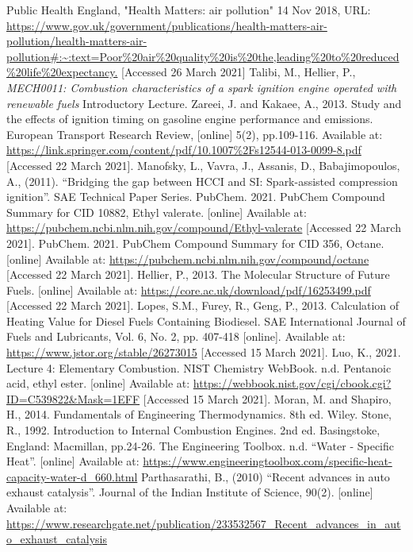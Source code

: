 \documentclass[11pt]{article}
\begin{document}
\begin{thebibliography}{00}
 Public Health England, "Health Matters: air pollution" 14 Nov 2018, URL: \url{https://www.gov.uk/government/publications/health-matters-air-pollution/health-matters-air-pollution#:~:text=Poor%20air%20quality%20is%20the,leading%20to%20reduced%20life%20expectancy.} [Accessed 26 March 2021]
 Talibi, M., Hellier, P., \textit{MECH0011: Combustion characteristics of a spark ignition engine operated with renewable fuels} Introductory Lecture.
 Zareei, J. and Kakaee, A., 2013. Study and the effects of ignition timing on gasoline engine performance and emissions. European Transport Research Review, [online] 5(2), pp.109-116. Available at: \url{https://link.springer.com/content/pdf/10.1007\%2Fs12544-013-0099-8.pdf} [Accessed 22 March 2021]. 
 Manofsky, L., Vavra, J., Assanis, D., Babajimopoulos, A., (2011). ``Bridging the gap between HCCI and SI: Spark-assisted compression ignition''. SAE Technical Paper Series. 
 PubChem. 2021. PubChem Compound Summary for CID 10882, Ethyl valerate. [online] Available at: \url{https://pubchem.ncbi.nlm.nih.gov/compound/Ethyl-valerate} [Accessed 22 March 2021]. 
 PubChem. 2021. PubChem Compound Summary for CID 356, Octane. [online] Available at: \url{https://pubchem.ncbi.nlm.nih.gov/compound/octane} [Accessed 22 March 2021]. 
 Hellier, P., 2013. The Molecular Structure of Future Fuels. [online] Available at: \url{https://core.ac.uk/download/pdf/16253499.pdf} [Accessed 22 March 2021]. 
 Lopes, S.M., Furey, R., Geng, P., 2013. Calculation of Heating Value for Diesel Fuels Containing Biodiesel. SAE International Journal of Fuels and Lubricants, Vol. 6, No. 2, pp. 407-418 [online]. Available at: \url{https://www.jstor.org/stable/26273015} [Accessed 15 March 2021]. 
 Luo, K., 2021. Lecture 4: Elementary Combustion.  
 NIST Chemistry WebBook. n.d. Pentanoic acid, ethyl ester. [online] Available at: \url{https://webbook.nist.gov/cgi/cbook.cgi?ID=C539822&Mask=1EFF} [Accessed 15 March 2021]. 
 Moran, M. and Shapiro, H., 2014. Fundamentals of Engineering Thermodynamics. 8th ed. Wiley. 
 Stone, R., 1992. Introduction to Internal Combustion Engines. 2nd ed. Basingstoke, England: Macmillan, pp.24-26.  
The Engineering Toolbox. n.d. ``Water - Specific Heat''. [online] Available at: \url{https://www.engineeringtoolbox.com/specific-heat-capacity-water-d_660.html}
 Parthasarathi, B., (2010) ``Recent advances in auto exhaust catalysis''. Journal of the Indian Institute of Science, 90(2). [online] Available at: \url{https://www.researchgate.net/publication/233532567_Recent_advances_in_auto_exhaust_catalysis}

\end{thebibliography}
\end{document}
